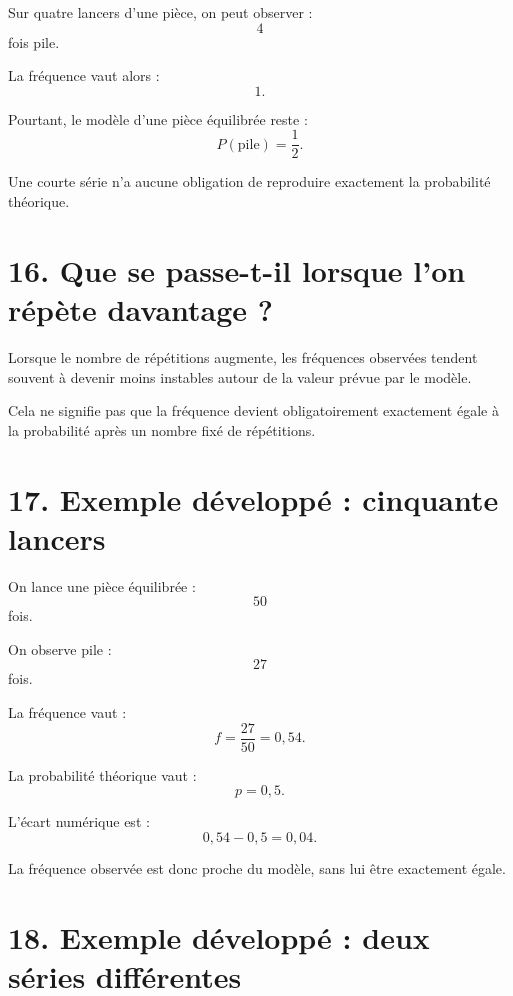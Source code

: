 Sur quatre lancers d'une pièce, on peut observer :
\[
4
\]
fois pile.

La fréquence vaut alors :
\[
1.
\]

Pourtant, le modèle d'une pièce équilibrée reste :
\[
P(\text{pile})=\dfrac12.
\]

Une courte série n'a aucune obligation de reproduire exactement la probabilité théorique.

\section{16. Que se passe-t-il lorsque l'on répète davantage ?}

Lorsque le nombre de répétitions augmente, les fréquences observées tendent souvent à devenir moins instables autour de la valeur prévue par le modèle.


\begin{attention}
Cela ne signifie pas que la fréquence devient obligatoirement exactement égale à la probabilité après un nombre fixé de répétitions.
\end{attention}

\section{17. Exemple développé : cinquante lancers}

On lance une pièce équilibrée :
\[
50
\]
fois.

On observe pile :
\[
27
\]
fois.

La fréquence vaut :
\[
f=\dfrac{27}{50}=0{,}54.
\]

La probabilité théorique vaut :
\[
p=0{,}5.
\]

L'écart numérique est :
\[
0{,}54-0{,}5=0{,}04.
\]

La fréquence observée est donc proche du modèle, sans lui être exactement égale.

\section{18. Exemple développé : deux séries différentes}

